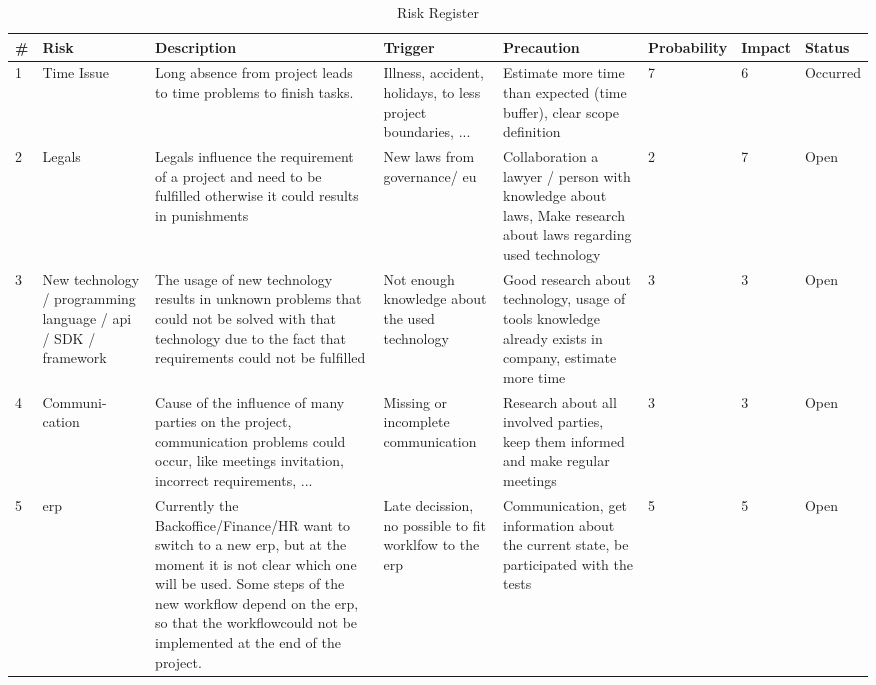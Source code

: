 \begin{center}
	\begin{landscape}
	   	\begin{table}[h]
    		\begin{tabular}{|p{}|p{2cm}|p{4cm}|p{4cm}|p{4cm}|p{1,5cm}|p{}|p{}|} \hline
    			\rowcolor{Gray} \# & Risk & Description & Trigger & Precaution & Probability & Impact & Status \\ \hline
    			1 & Time Issue & Long absence from project leads to time problems to finish tasks. & Illness, accident, holidays, to less project boundaries, ... & Estimate more time than expected (time buffer), clear scope definition & 7 & 6 & Occurred \\ \hline
    			2 & Legals & Legals influence the requirement of a project and need to be fulfilled otherwise it could results in punishments & New laws from governance/ \gls{eu} & Collaboration a lawyer / person with knowledge about laws, Make research about laws regarding used technology & 2 & 7 & Open \\ \hline
    			3 & New technology / programming language / \gls{api} / \gls{SDK} / framework & The usage of new technology results	in unknown problems that could not be solved with that technology due to the fact that requirements could not be fulfilled & Not enough knowledge about 	the used technology & Good research about technology, usage of tools knowledge already exists in company, estimate more time & 3 & 3 & Open \\ \hline
    			4 & Communi- cation & Cause of the influence of many parties on the project, communication problems could occur, like meetings invitation, incorrect requirements, ... & Missing or incomplete communication & Research about all involved parties, keep them informed and make regular meetings & 3 & 3 & Open \\ \hline
    			5 & \gls{erp} & Currently the Backoffice/Finance/HR	want to switch to a new \gls{erp},
    			but at the moment it is not clear which	one will be used. Some steps of	the new workflow depend on the \gls{erp}, so that the workflowcould not be implemented at the end	of the project. & Late decission, no possible to fit worklfow to the \gls{erp} & Communication, get information about the current state, be participated with the tests & 5 & 5 & Open \\ \hline
    		\end{tabular}
    		\caption{Risk Register}
    		\label{fig:risks}
    	\end{table}
   \end{landscape}
\end{center}
